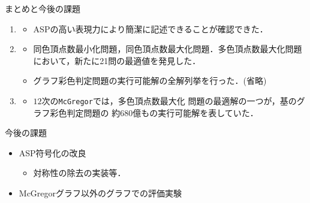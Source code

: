 \documentclass[dvipdfmx,11pt]{beamer}
\newcommand{\code}[1]{\lstinline[basicstyle=\ttfamily]{#1}}
\begin{document}
\begin{frame}{まとめと今後の課題}
 \begin{enumerate}
  \item {}
        \begin{itemize}
         \item ASPの高い表現力により簡潔に記述できることが確認できた．
        \end{itemize}
  \item {}
        \begin{itemize}
         \item 同色頂点数最小化問題，同色頂点数最大化問題．多色頂点数最大化問題
               において，新たに21問の最適値を発見した．%
         \item グラフ彩色判定問題の実行可能解の全解列挙を行った．(省略)
        \end{itemize}
  \item {}
        \begin{itemize}
	 \item $12$次の\code{McGregor}では，多色頂点数最大化
	       問題の最適解の一つが，基のグラフ彩色判定問題の
	       約680億もの実行可能解を表していた．
        \end{itemize}
 \end{enumerate}

 \begin{block}{今後の課題}
  \begin{itemize}
   \item ASP符号化の改良
         \begin{itemize}
          \item 対称性の除去の実装等．
         \end{itemize}
   \item McGregorグラフ以外のグラフでの評価実験
  \end{itemize}
 \end{block}
\end{frame}
\end{document}
